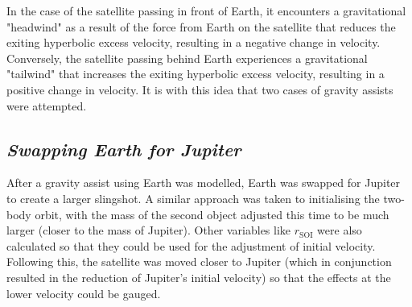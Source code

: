 \documentclass[11pt, english]{report}
\begin{document}
In the case of the satellite passing in front of Earth, it encounters a gravitational "headwind" as a result of the force from Earth on the satellite that reduces the exiting hyperbolic excess velocity, resulting in a negative change in velocity. Conversely, the satellite passing behind Earth experiences a gravitational "tailwind" that increases the exiting hyperbolic excess velocity, resulting in a positive change in velocity. It is with this idea that two cases of gravity assists were attempted.

\subsection{\textsl{Swapping Earth for Jupiter}}
\normalsize{\noindent After a gravity assist using Earth was modelled, Earth was swapped for Jupiter to create a larger slingshot. A similar approach was taken to initialising the two-body orbit, with the mass of the second object adjusted this time to be much larger (closer to the mass of Jupiter). Other variables like $r_\mathrm{{SOI}}$ were also calculated so that they could be used for the adjustment of initial velocity.
Following this, the satellite was moved closer to Jupiter (which in conjunction resulted in the reduction of Jupiter's initial velocity) so that the effects at the lower velocity could be gauged.
}
\end{document}
